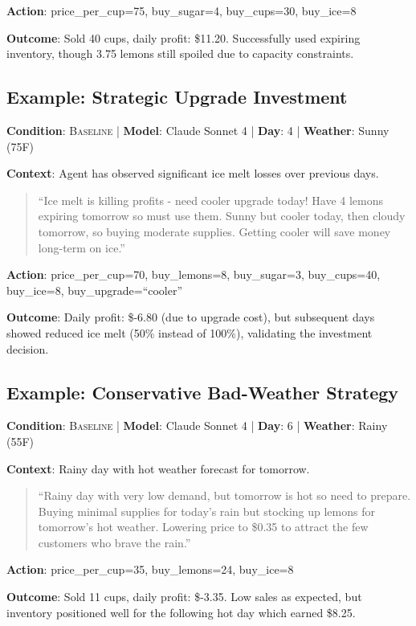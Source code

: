 \textbf{Action}: price\_per\_cup=75, buy\_sugar=4, buy\_cups=30, buy\_ice=8

\textbf{Outcome}: Sold 40 cups, daily profit: \$11.20. Successfully used expiring inventory, though 3.75 lemons still spoiled due to capacity constraints.

\subsection{Example: Strategic Upgrade Investment}
\textbf{Condition}: \textsc{Baseline} | \textbf{Model}: Claude Sonnet 4 | \textbf{Day}: 4 | \textbf{Weather}: Sunny (75\textdegree F)

\textbf{Context}: Agent has observed significant ice melt losses over previous days.

\begin{quote}
\small\ttfamily
``Ice melt is killing profits - need cooler upgrade today! Have 4 lemons expiring tomorrow so must use them. Sunny but cooler today, then cloudy tomorrow, so buying moderate supplies. Getting cooler will save money long-term on ice.''
\end{quote}

\textbf{Action}: price\_per\_cup=70, buy\_lemons=8, buy\_sugar=3, buy\_cups=40, buy\_ice=8, buy\_upgrade=``cooler''

\textbf{Outcome}: Daily profit: \$-6.80 (due to upgrade cost), but subsequent days showed reduced ice melt (50\% instead of 100\%), validating the investment decision.

\subsection{Example: Conservative Bad-Weather Strategy}
\textbf{Condition}: \textsc{Baseline} | \textbf{Model}: Claude Sonnet 4 | \textbf{Day}: 6 | \textbf{Weather}: Rainy (55\textdegree F)

\textbf{Context}: Rainy day with hot weather forecast for tomorrow.

\begin{quote}
\small\ttfamily
``Rainy day with very low demand, but tomorrow is hot so need to prepare. Buying minimal supplies for today's rain but stocking up lemons for tomorrow's hot weather. Lowering price to \$0.35 to attract the few customers who brave the rain.''
\end{quote}

\textbf{Action}: price\_per\_cup=35, buy\_lemons=24, buy\_ice=8

\textbf{Outcome}: Sold 11 cups, daily profit: \$-3.35. Low sales as expected, but inventory positioned well for the following hot day which earned \$8.25.


